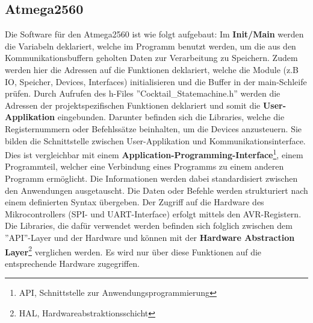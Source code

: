 \subsection{Atmega2560}
\label{subsec:Software_Atmega2560}

Die Software für den Atmega2560 ist wie folgt aufgebaut: Im \textbf{Init/Main} werden die Variabeln deklariert, welche im Programm benutzt werden, um die aus den Kommunikationsbuffern geholten Daten zur Verarbeitung zu Speichern. Zudem werden hier die Adressen auf die Funktionen deklariert, welche die Module (z.B IO, Speicher, Devices, Interfaces) initialisieren und die Buffer in der main-Schleife prüfen. Durch Aufrufen des h-Files ''Cocktail\_Statemachine.h'' werden die Adressen der projektspezifischen Funktionen deklariert und somit die \textbf{User-Applikation} eingebunden. Darunter befinden sich die Libraries, welche die Registernummern oder Befehlssätze beinhalten, um die Devices anzusteuern. Sie bilden die Schnittstelle zwischen User-Applikation und Kommunikationsinterface. Dies ist vergleichbar mit einem \textbf{Application-Programming-Interface}\footnote{API, Schnittstelle zur Anwendungsprogrammierung}, einem Programmteil, welcher eine Verbindung eines Programms zu einem anderen Programm ermöglicht. Die Informationen werden dabei standardisiert zwischen den Anwendungen ausgetauscht. Die Daten oder Befehle werden strukturiert nach einem definierten Syntax übergeben. Der Zugriff auf die Hardware des Mikrocontrollers (SPI- und UART-Interface) erfolgt mittels den AVR-Registern. Die Libraries, die dafür verwendet werden befinden sich folglich zwischen dem ''API''-Layer und der Hardware und können mit der \textbf{Hardware Abstraction Layer}\footnote{HAL, Hardwareabstraktionsschicht} verglichen werden. Es wird nur über diese Funktionen auf die entsprechende Hardware zugegriffen.